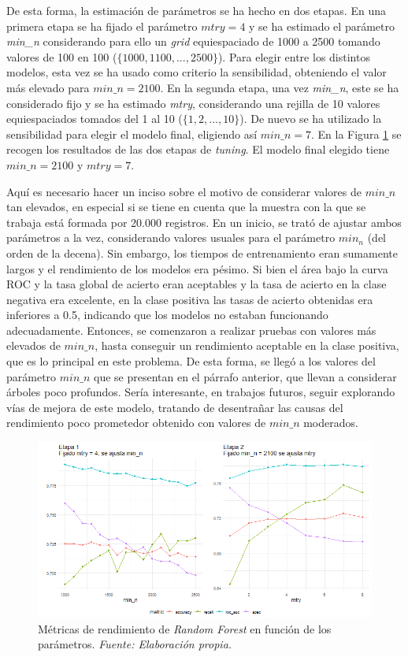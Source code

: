 \documentclass[12pt,a4paper,]{book}
\numberwithin{dummy}{section}
\theoremstyle{ocrenumbox}
\theoremstyle{blacknumex}
\theoremstyle{blacknumbox}
\theoremstyle{ocrenum}
\theoremstyle{ocrenum}
\begin{document}
De esta forma, la estimación de parámetros se ha hecho en dos etapas. En
una primera etapa se ha fijado el parámetro \(mtry = 4\) y se ha
estimado el parámetro \emph{min\_n} considerando para ello un
\emph{grid} equiespaciado de 1000 a 2500 tomando valores de 100 en 100
(\(\{1000,1100,...,2500\}\)). Para elegir entre los distintos modelos,
esta vez se ha usado como criterio la sensibilidad, obteniendo el valor
más elevado para \(min\_n = 2100\). En la segunda etapa, una vez
\emph{min\_n}, este se ha considerado fijo y se ha estimado \emph{mtry},
considerando una rejilla de 10 valores equiespaciados tomados del 1 al
10 (\(\{1,2,...,10\}\)). De nuevo se ha utilizado la sensibilidad para
elegir el modelo final, eligiendo así \(min\_n = 7\). En la Figura
\ref{fig:rf_tuningplot} se recogen los resultados de las dos etapas de
\emph{tuning}. El modelo final elegido tiene \(min\_n = 2100\) y
\(mtry = 7\).

Aquí es necesario hacer un inciso sobre el motivo de considerar valores
de \(min\_n\) tan elevados, en especial si se tiene en cuenta que la
muestra con la que se trabaja está formada por 20.000 registros. En un
inicio, se trató de ajustar ambos parámetros a la vez, considerando
valores usuales para el parámetro \(min_n\) (del orden de la decena).
Sin embargo, los tiempos de entrenamiento eran sumamente largos y el
rendimiento de los modelos era pésimo. Si bien el área bajo la curva ROC
y la tasa global de acierto eran aceptables y la tasa de acierto en la
clase negativa era excelente, en la clase positiva las tasas de acierto
obtenidas era inferiores a 0.5, indicando que los modelos no estaban
funcionando adecuadamente. Entonces, se comenzaron a realizar pruebas
con valores más elevados de \(min\_n\), hasta conseguir un rendimiento
aceptable en la clase positiva, que es lo principal en este problema. De
esta forma, se llegó a los valores del parámetro \(min\_n\) que se
presentan en el párrafo anterior, que llevan a considerar árboles poco
profundos. Sería interesante, en trabajos futuros, seguir explorando
vías de mejora de este modelo, tratando de desentrañar las causas del
rendimiento poco prometedor obtenido con valores de \(min\_n\)
moderados.

\begin{figure}[h!]
\centering
\includegraphics[width =\textwidth]{graficos/rf_tuningplot.png}
\caption[Métricas de rendimiento de \textit{Random Forest} en función de los parámetros]{Métricas de rendimiento de \textit{Random Forest} en función de los parámetros.  \it Fuente: Elaboración propia.}
\label{fig:rf_tuningplot}
\end{figure}
\end{document}
